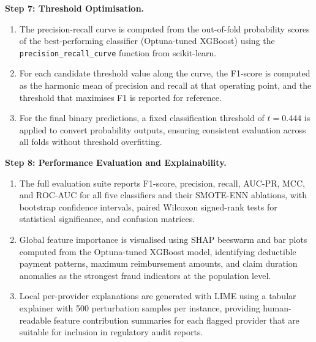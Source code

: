\vspace{0.5em}
\noindent\textbf{Step 7: Threshold Optimisation.}

\begin{enumerate}[label=\roman*.]
  \item The precision-recall curve is computed from the out-of-fold probability
  scores of the best-performing classifier (Optuna-tuned XGBoost) using the
  \texttt{precision\_recall\_curve} function from scikit-learn.
  \item For each candidate threshold value along the curve, the F1-score is
  computed as the harmonic mean of precision and recall at that operating point,
  and the threshold that maximises F1 is reported for reference.
  \item For the final binary predictions, a fixed classification threshold of
  $t = 0.444$ is applied to convert probability outputs, ensuring consistent
  evaluation across all folds without threshold overfitting.
\end{enumerate}

\vspace{0.5em}
\noindent\textbf{Step 8: Performance Evaluation and Explainability.}

\begin{enumerate}[label=\roman*.]
  \item The full evaluation suite reports F1-score, precision, recall, AUC-PR,
  MCC, and ROC-AUC for all five classifiers and their SMOTE-ENN ablations, with
  bootstrap confidence intervals, paired Wilcoxon signed-rank tests for
  statistical significance, and confusion matrices.
  \item Global feature importance is visualised using SHAP beeswarm and bar plots
  computed from the Optuna-tuned XGBoost model, identifying deductible payment
  patterns, maximum reimbursement amounts, and claim duration anomalies as the
  strongest fraud indicators at the population level.
  \item Local per-provider explanations are generated with LIME using a tabular
  explainer with 500 perturbation samples per instance, providing human-readable
  feature contribution summaries for each flagged provider that are suitable for
  inclusion in regulatory audit reports.
\end{enumerate}
